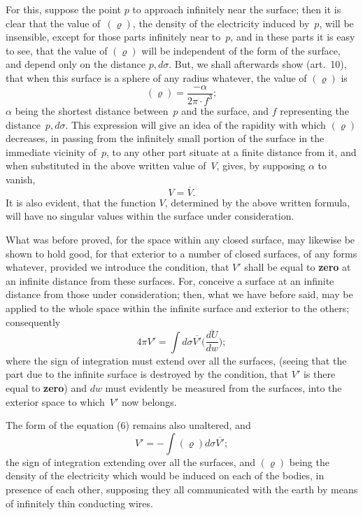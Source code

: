 \documentclass[12pt,notitlepage]{amsart}
\let\Emphasis\textbf
\renewcommand{\rho}{\varrho}
\begin{document}
For this, suppose the point $p$ to approach infinitely near the surface;
then it is clear that the value of~$(\rho)$,
the density of the electricity induced
by~$p$, will be insensible,
except for those parts infinitely near to~$p$, and in
these parts it is easy to see,
that the value of $(\rho)$ will be independent of the
form of the surface, and depend only on the distance $p,d\sigma$.
But, we shall
afterwards show (art.~10), that when this surface is a sphere of any radius
whatever, the value of $(\rho)$ is
\[
(\rho)=\frac{-\alpha}{2\pi\cdot f^3};
\]
$\alpha$ being the shortest distance between~$p$ and the surface,
and $f$ representing
the distance~$p,d\sigma$.
This expression will give an idea of the rapidity with
which $(\rho)$ decreases,
in passing from the infinitely small portion of the surface
in the immediate vicinity of~$p$,
to any other part situate at a finite distance
from it, and when substituted in the above written value of~$V$, gives, by
supposing $\alpha$ to vanish,
\[
V=\overline{V}.
\]
It is also evident, that the function $V$, determined by the above written 
formula, will have no singular values within the surface under consideration.

What was before proved, for the space within any closed surface,
may likewise be shown to hold good, for that exterior to a number of closed
surfaces, of any forms whatever, provided we introduce the condition, that $V'$
shall be equal to \Emphasis{zero}
at an infinite distance from these surfaces. For, 
conceive a surface at an infinite distance from those under consideration; then,
what we have before said, may be applied to the whole space within the
infinite surface and exterior to the others; consequently
\[
\tag{5'.}
4\pi V'=\int d\sigma\overline{V'}
\biggl(\frac{\overline{dU}}{dw}\biggr);
\]
where the sign of integration must extend over all the surfaces, (seeing that
the part due to the infinite surface is destroyed by the condition, that $V'$ is
there equal to \Emphasis{zero})
and $dw$ must evidently be measured from the surfaces,
into the exterior space to which~$V'$ now belongs.

The form of the equation (6) remains also unaltered, and
\[
\tag{6'.}
V'=-\int(\rho)d\sigma\overline{V'};
\]
the sign of integration extending over all the surfaces,
and $(\rho)$ being the density
of the electricity which would be induced
on each of the bodies, in presence
of each other, supposing they all communicated with the earth by means of
infinitely thin conducting wires.
\bigskip
\end{document}

